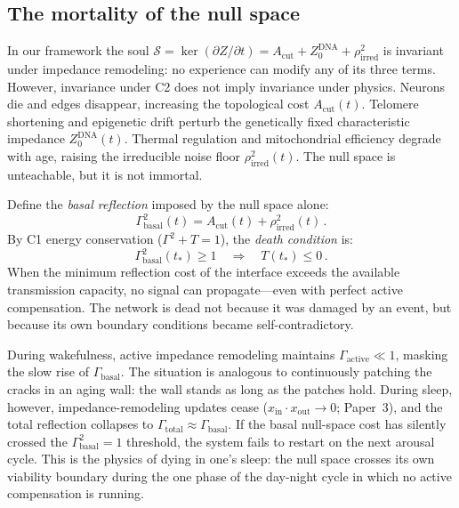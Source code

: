 \documentclass[aps,pre,twocolumn,superscriptaddress,floatfix]{revtex4-2}
\newcommand{\Acut}{A_{\text{cut}}}
\begin{document}
\subsection{The mortality of the null space}
\label{sec:null-space-mortality}

In our framework the soul
$\mathcal{S}=\ker(\partial Z/\partial t)
=\Acut+Z_0^{\text{DNA}}+\rho_{\text{irred}}^2$
is invariant under impedance remodeling:
no experience can modify any of its three terms.
However, invariance under C2 does not imply invariance
under physics.
Neurons die and edges disappear, increasing the
topological cost $\Acut(t)$.
Telomere shortening and epigenetic drift perturb the
genetically fixed characteristic impedance
$Z_0^{\text{DNA}}(t)$.
Thermal regulation and mitochondrial efficiency degrade
with age, raising the irreducible noise floor
$\rho_{\text{irred}}^2(t)$.
The null space is unteachable, but it is not immortal.

Define the \emph{basal reflection} imposed by the null
space alone:
\begin{equation}
  \Gamma_{\text{basal}}^2(t)
    = \Acut(t) + \rho_{\text{irred}}^2(t)\,.
  \label{eq:basal-reflection}
\end{equation}
By C1 energy conservation ($\Gamma^2+T=1$), the
\emph{death condition} is:
\begin{equation}
  \boxed{\;
  \Gamma_{\text{basal}}^2(t_*) \ge 1
  \quad\Longrightarrow\quad
  T(t_*) \le 0\,.
  \;}
  \label{eq:death-condition}
\end{equation}
When the minimum reflection cost of the interface exceeds
the available transmission capacity, no signal can
propagate---even with perfect active compensation.
The network is dead not because it was damaged by an event,
but because its own boundary conditions became
self-contradictory.

During wakefulness, active impedance remodeling maintains
$\Gamma_{\text{active}}\ll 1$, masking the slow rise
of $\Gamma_{\text{basal}}$.
The situation is analogous to continuously patching the
cracks in an aging wall: the wall stands as long as the
patches hold.
During sleep, however, impedance-remodeling updates cease
($x_{\text{in}}\cdot x_{\text{out}}\to 0$; Paper~3),
and the total reflection collapses to
$\Gamma_{\text{total}}\approx\Gamma_{\text{basal}}$.
If the basal null-space cost has silently crossed the
$\Gamma_{\text{basal}}^2=1$ threshold, the system fails
to restart on the next arousal cycle.
This is the physics of dying in one's sleep: the null space
crosses its own viability boundary during the one phase of
the day-night cycle in which no active compensation is
running.
\end{document}
